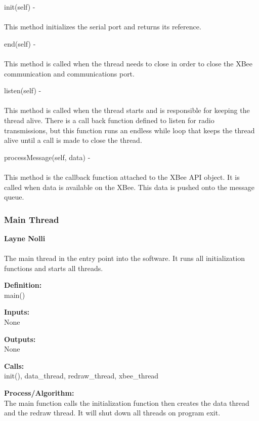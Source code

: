 \documentclass[10pt,draftclsnofoot,onecolumn,compsoc]{IEEEtran}
\begin{document}
init(self) - \\ \\
This method initializes the serial port and returns its reference. \par

end(self) - \\ \\
This method is called when the thread needs to close in order to close the XBee communication and communications port. \par

listen(self) - \\ \\
This method is called when the thread starts and is responsible for keeping the thread alive. There is a call back function defined to listen for radio transmissions, but this function runs an endless while loop that keeps the thread alive until a call is made to close the thread. \par

processMessage(self, data) - \\ \\
This method is the callback function attached to the XBee API object. It is called when data is available on the XBee. This data is pushed onto the message queue.


\subsubsection{Main Thread}
{\bf Layne Nolli } 
\\ \\
The main thread in the entry point into the software. It runs all initialization functions and starts all threads. \par
{\bf Definition:} \\ 
main() \par
{\bf Inputs:} \\  None \par
{\bf Outputs:} \\ None \par
{\bf Calls:} \\ init(), data\_thread, redraw\_thread, xbee\_thread \par
{\bf Process/Algorithm:} \\
The main function calls the initialization function then creates the data thread and the redraw thread. It will shut down all threads on program exit. \par
\end{document}
